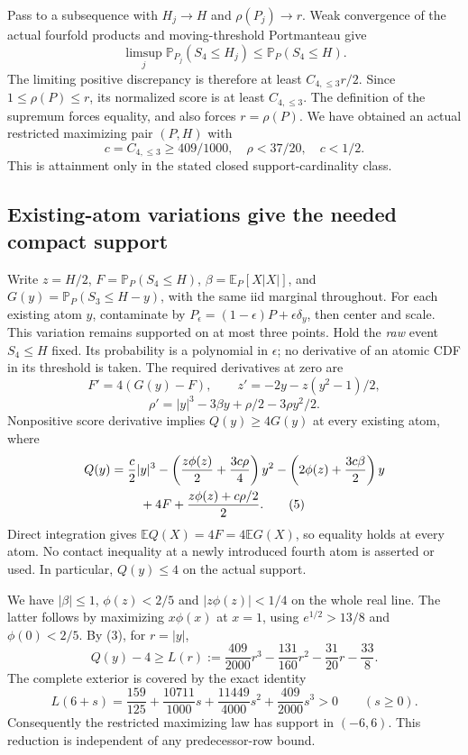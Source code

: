 \documentclass[11pt,a4paper]{article}
\numberwithin{equation}{section}
\theoremstyle{definition}
\theoremstyle{remark}
\newcommand{\E}{\mathbb E}
\newcommand{\Pp}{\mathbb P}
\begin{document}
Pass to a subsequence with $H_j\to H$ and $\rho(P_j)\to r$.
Weak convergence of the actual fourfold products and moving-threshold
Portmanteau give
\[
 \limsup_j\Pp_{P_j}(S_4\le H_j)\le\Pp_P(S_4\le H).
\]
The limiting positive discrepancy is therefore at least
$C_{4,\le3}r/2$. Since $1\le\rho(P)\le r$, its normalized score is
at least $C_{4,\le3}$. The definition of the supremum forces equality,
and also forces $r=\rho(P)$. We have obtained an actual restricted
maximizing pair $(P,H)$ with
\[
 c=C_{4,\le3}\ge409/1000,\quad \rho<37/20,\quad c<1/2.
\tag{3}
\]
This is attainment only in the stated closed support-cardinality class.

\subsection{Existing-atom variations give the needed compact support}
Write $z=H/2$, $F=\Pp_P(S_4\le H)$, $\beta=\E_P[X|X|]$, and
$G(y)=\Pp_P(S_3\le H-y)$, with the same iid marginal throughout.
For each existing atom $y$, contaminate by
$P_\epsilon=(1-\epsilon)P+\epsilon\delta_y$, then center and scale.
This variation remains supported on at most three points. Hold the
\emph{raw} event $S_4\le H$ fixed. Its probability is a polynomial in
$\epsilon$; no derivative of an atomic CDF in its threshold is taken.
The required derivatives at zero are
\[
 F'=4(G(y)-F),\qquad z'=-2y-z(y^2-1)/2,
\]
\[
 \rho'=|y|^3-3\beta y+\rho/2-3\rho y^2/2.
\tag{4}
\]
Nonpositive score derivative implies $Q(y)\ge4G(y)$ at every existing
atom, where
\begin{align}
 Q(y)={}&\frac c2|y|^3-
 \left(\frac{z\phi(z)}2+\frac{3c\rho}4\right)y^2
 -\left(2\phi(z)+\frac{3c\beta}2\right)y\notag\\
 &\quad+4F+\frac{z\phi(z)+c\rho/2}{2}.\tag{5}
\end{align}
Direct integration gives $\E Q(X)=4F=4\E G(X)$, so equality holds
at every atom. No contact inequality at a newly introduced fourth atom
is asserted or used. In particular, $Q(y)\le4$ on the actual support.

We have $|\beta|\le1$, $\phi(z)<2/5$ and $|z\phi(z)|<1/4$ on the
whole real line. The latter follows by maximizing $x\phi(x)$ at $x=1$,
using $e^{1/2}>13/8$ and $\phi(0)<2/5$.
By (3), for $r=|y|$,
\[
 Q(y)-4\ge L(r):=\frac{409}{2000}r^3-\frac{131}{160}r^2
                         -\frac{31}{20}r-\frac{33}{8}.
\tag{6}
\]
The complete exterior is covered by the exact identity
\[
 L(6+s)=\frac{159}{125}+\frac{10711}{1000}s
         +\frac{11449}{4000}s^2+\frac{409}{2000}s^3>0
          \qquad(s\ge0).\tag{7}
\]
Consequently the restricted maximizing law has support in $(-6,6)$.
This reduction is independent of any predecessor-row bound.
\end{document}
